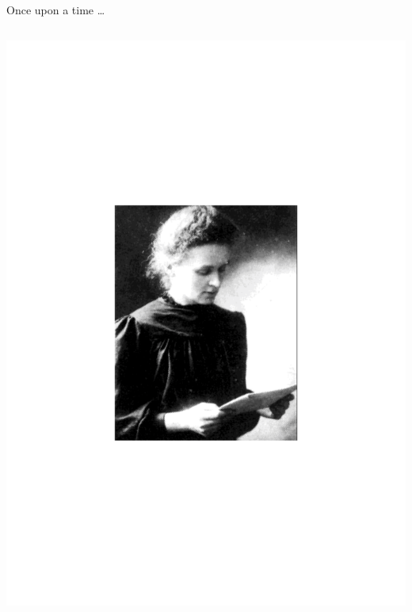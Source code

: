 \begin{frame}{Once upon a time \ldots}
\begin{columns}[T]
    \begin{column}{.6\textwidth}
   \includegraphics[scale=0.3]{figures/20160216_rsw_marie.pdf}
    \end{column}

\end{columns}

\end{frame}

